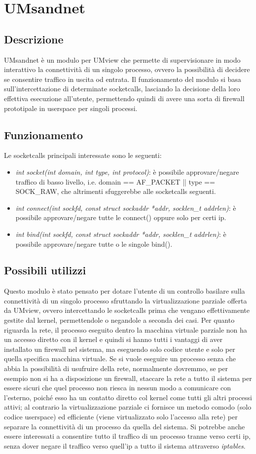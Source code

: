 \chapter{UMsandnet}
\section{Descrizione}
UMsandnet è un modulo per UMview che permette di supervisionare in modo interattivo la connettività di un singolo processo, ovvero la possibilità di decidere se consentire traffico in uscita od entrata.
Il funzionamento del modulo si basa sull'intercettazione di determinate socketcalls, lasciando la decisione della loro effettiva esecuzione all'utente, permettendo quindi di avere una sorta di firewall prototipale in userspace per singoli processi.
\section{Funzionamento}
Le socketcalls principali interessate sono le seguenti:
\begin{itemize}
\item {\em int socket(int domain, int type, int protocol)}: è possibile approvare/negare traffico di basso livello, i.e. domain == AF\_PACKET || type == SOCK\_RAW, che altrimenti sfuggerebbe alle socketcalls seguenti.
\item {\em int connect(int sockfd, const struct sockaddr *addr, socklen\_t addrlen)}: è possibile approvare/negare tutte le connect() oppure solo per certi ip.
\item {\em int bind(int sockfd, const struct sockaddr *addr, socklen\_t addrlen)}: è possibile approvare/negare tutte o le singole bind().
\end{itemize}
\section{Possibili utilizzi}
Questo modulo è stato pensato per dotare l'utente di un controllo basilare sulla connettività di un singolo processo sfruttando la virtualizzazione parziale offerta da UMview, ovvero intercettando le socketcalls prima che vengano effettivamente gestite dal kernel, permettendole o negandole a seconda dei casi. Per quanto riguarda la rete, il processo eseguito dentro la macchina virtuale parziale non ha un accesso diretto con il kernel e quindi si hanno tutti i vantaggi di aver installato un firewall nel sistema, ma eseguendo solo codice utente e solo per quella specifica macchina virtuale. Se si vuole eseguire un processo senza che abbia la possibilità di usufruire della rete, normalmente dovremmo, se per esempio non si ha a disposizione un firewall, staccare la rete a tutto il sistema per essere sicuri che quel processo non riesca in nessun modo a comunicare con l'esterno, poiché esso ha un contatto diretto col kernel come tutti gli altri processi attivi; al contrario la virtualizzazione parziale ci fornisce un metodo comodo (solo codice userspace) ed efficiente (viene virtualizzato solo l'accesso alla rete) per separare la connettività di un processo da quella del sistema.
Si potrebbe anche essere interessati a consentire tutto il traffico di un processo tranne verso certi ip, senza dover negare il traffico verso quell'ip a tutto il sistema attraverso {\em iptables}.
